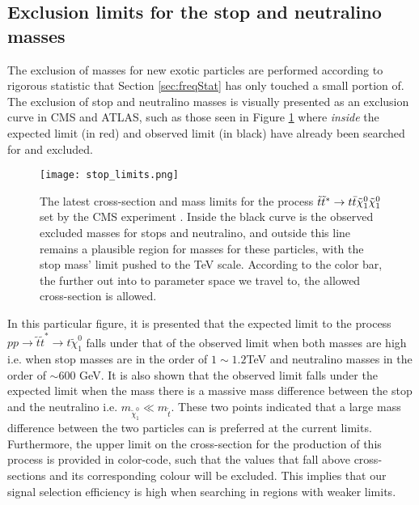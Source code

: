 \subsection{Exclusion limits for the stop and neutralino masses}
The exclusion of masses for new exotic particles are performed according to rigorous statistic that Section \ref{sec:freqStat} has only touched a small portion of. The exclusion of stop and neutralino masses is visually presented as an exclusion curve in CMS and ATLAS, such as those seen in Figure \ref{fig:limits} \cite{cms2019search} where \textit{inside} the expected limit (in red) and observed limit (in black) have already been searched for and excluded. \\

\begin{figure}[htbp]
    \centering
    \texttt{[image: stop\_limits.png]}
    \caption{The latest cross-section and mass limits for the process $\Tilde{t}\Tilde{t}^* \rightarrow t\bar{t}\Tilde{\chi}_1^0\Tilde{\chi}_1^0 $ set by the CMS experiment \cite{cms2019search}. Inside the black curve is the observed excluded masses for stops and neutralino, and outside this line remains a plausible region for masses for these particles, with the stop mass' limit pushed to the TeV scale. According to the color bar, the further out into to parameter space we travel to, the allowed cross-section is allowed.}
    \label{fig:limits}
\end{figure}

In this particular figure, it is presented that the expected limit to the process $pp \rightarrow \tilde{t}\tilde{t}^* \rightarrow t\tilde{\chi}_1^0$ falls under that of the observed limit when both masses are high i.e. when stop masses are in the order of $1\sim1.2$TeV and neutralino masses in the order of $\sim600$ GeV. It is also shown that the observed limit falls under the expected limit when the mass there is a massive mass difference between the stop and the neutralino i.e. $m_{\tilde{\chi}_1^0}\ll m_{\tilde{t}}$. These two points indicated that a large mass difference between the two particles can is preferred at the current limits. Furthermore, the upper limit on the cross-section for the production of this process is provided in color-code, such that the values that fall above cross-sections and its corresponding colour will be excluded. This implies that our signal selection efficiency is high when searching in regions with weaker limits. \\

